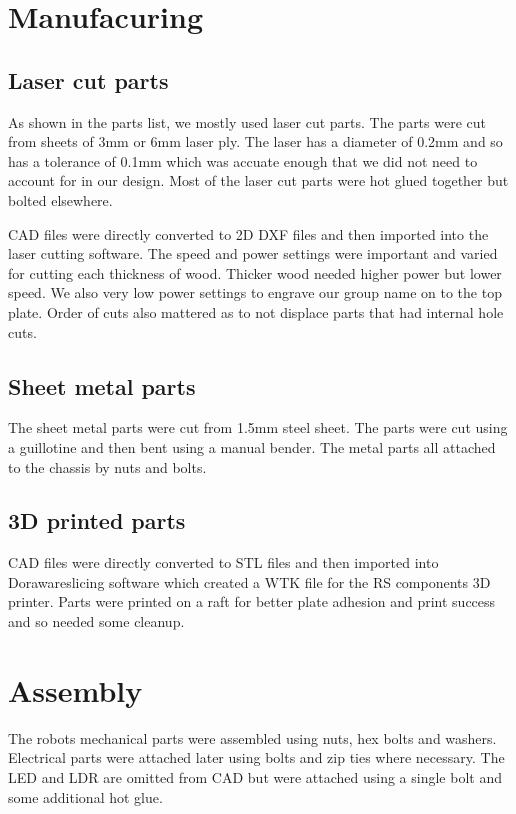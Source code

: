 \documentclass{article}
\begin{document}
\section{Manufacuring}

\subsection{Laser cut parts}
\quad As shown in the parts list, we mostly used laser cut parts. The parts were cut from sheets of 3mm or 6mm laser ply. The laser has a diameter of 0.2mm and so has a tolerance of 0.1mm which was accuate enough that we did not need to account for in our design. Most of the laser cut parts were hot glued together but bolted elsewhere.

\quad CAD files were directly converted to 2D DXF files and then imported into the laser cutting software. The speed and power settings were important and varied for cutting each thickness of wood. Thicker wood needed higher power but lower speed. We also very low power settings to engrave our group name on to the top plate. Order of cuts also mattered as to not displace parts that had internal hole cuts.

\subsection{Sheet metal parts}
\quad The sheet metal parts were cut from 1.5mm steel sheet. The parts were cut using a guillotine and then bent using a manual bender. The metal parts all attached to the chassis by nuts and bolts.

\subsection{3D printed parts}
\quad CAD files were directly converted to STL files and then imported into Dorawareslicing software which created a WTK file for the RS components 3D printer. Parts were printed on a raft for better plate adhesion and print success and so needed some cleanup.
 
\section{Assembly}
\quad The robots mechanical parts were assembled using nuts, hex bolts and washers. Electrical parts were attached later using bolts and zip ties where necessary. The LED and LDR are omitted from CAD but were attached using a single bolt and some additional hot glue.
\end{document}
